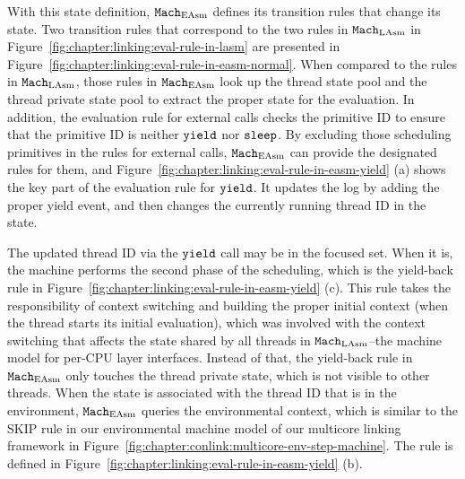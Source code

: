 With this state definition, ${\mathrm{\texttt{Mach}}}_{\mathrm{EAsm}}$ defines its transition rules that change its state. 
Two transition rules that correspond to the two rules in ${\mathrm{\texttt{Mach}}}_{\mathrm{LAsm}}$ in Figure~\ref{fig:chapter:linking:eval-rule-in-lasm}
are presented in Figure~\ref{fig:chapter:linking:eval-rule-in-easm-normal}.
When compared to the rules in ${\mathrm{\texttt{Mach}}}_{\mathrm{LAsm}}$,
those rules in ${\mathrm{\texttt{Mach}}}_{\mathrm{EAsm}}$ look up the thread state pool and the thread private state pool 
to extract the proper state for the evaluation.
In addition, the evaluation rule for external calls checks the primitive ID to ensure that 
the primitive ID is neither ${\mathrm{\texttt{yield}}}$ nor ${\mathrm{\texttt{sleep}}}$. 
By excluding those scheduling primitives in the rules for external calls, 
${\mathrm{\texttt{Mach}}}_{\mathrm{EAsm}}$ can provide the designated rules for them, and 
Figure~\ref{fig:chapter:linking:eval-rule-in-easm-yield} (a) shows
the key part of the evaluation rule for ${\mathrm{\texttt{yield}}}$. 
It updates the log by adding the proper yield event, and then changes the currently running thread ID in the state. 

The updated thread ID via the ${\mathrm{\texttt{yield}}}$ call may be in the focused set.
When it is,
 the machine performs the second phase of the scheduling, 
which is the yield-back rule in Figure~\ref{fig:chapter:linking:eval-rule-in-easm-yield} (c).
This rule takes the responsibility of context switching and building the proper initial context (when the thread starts its initial evaluation),
which was involved with the context switching that affects the state shared by all threads in ${\mathrm{\texttt{Mach}}}_{\mathrm{LAsm}}$--the machine model for per-CPU layer interfaces. 
Instead of that,
the yield-back rule in ${\mathrm{\texttt{Mach}}}_{\mathrm{EAsm}}$ only touches the thread private state, which is not visible to other threads.
When the state is associated with the thread ID that is in the environment,
${\mathrm{\texttt{Mach}}}_{\mathrm{EAsm}}$ queries the environmental context, which is similar to the \textsf{SKIP} rule in our environmental machine model of our multicore linking framework in Figure~\ref{fig:chapter:conlink:multicore-env-step-machine}. 
The rule is defined in Figure~\ref{fig:chapter:linking:eval-rule-in-easm-yield} (b).

